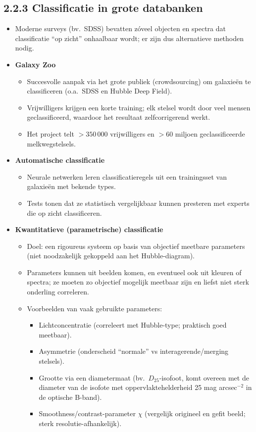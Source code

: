 \documentclass[10pt,a4paper]{article}
\begin{document}
\subsection*{2.2.3 Classificatie in grote databanken}
\begin{itemize}
  \item Moderne surveys (bv.\ SDSS) bevatten zóveel objecten en spectra dat classificatie ``op zicht'' onhaalbaar wordt; er zijn dus alternatieve methoden nodig.

  \item \textbf{Galaxy Zoo}
  \begin{itemize}
    \item Succesvolle aanpak via het grote publiek (crowdsourcing) om galaxieën te classificeren (o.a.\ SDSS en Hubble Deep Field).
    \item Vrijwilligers krijgen een korte training; elk stelsel wordt door veel mensen geclassificeerd, waardoor het resultaat zelfcorrigerend werkt.
    \item Het project telt $>350\,000$ vrijwilligers en $>60$ miljoen geclassificeerde melkwegstelsels.
  \end{itemize}

  \item \textbf{Automatische classificatie}
  \begin{itemize}
    \item Neurale netwerken leren classificatieregels uit een trainingsset van galaxieën met bekende types.
    \item Tests tonen dat ze statistisch vergelijkbaar kunnen presteren met experts die op zicht classificeren.
  \end{itemize}

  \item \textbf{Kwantitatieve (parametrische) classificatie}
  \begin{itemize}
    \item Doel: een rigoureus systeem op basis van objectief meetbare parameters (niet noodzakelijk gekoppeld aan het Hubble-diagram).
    \item Parameters kunnen uit beelden komen, en eventueel ook uit kleuren of spectra; ze moeten zo objectief mogelijk meetbaar zijn en liefst niet sterk onderling correleren.
    \item Voorbeelden van vaak gebruikte parameters:
    \begin{itemize}
      \item Lichtconcentratie (correleert met Hubble-type; praktisch goed meetbaar).
      \item Asymmetrie (onderscheid ``normale'' vs interagerende/merging stelsels).
      \item Grootte via een diametermaat (bv.\ $D_{25}$-isofoot, komt overeen met de diameter van de isofote met oppervlaktehelderheid 25 mag arcsec$^{-2}$ in de optische B-band).
      \item Smoothness/contrast-parameter $\chi$ (vergelijk origineel en gefit beeld; sterk resolutie-afhankelijk).
    \end{itemize}
  \end{itemize}


\end{itemize}
\end{document}
